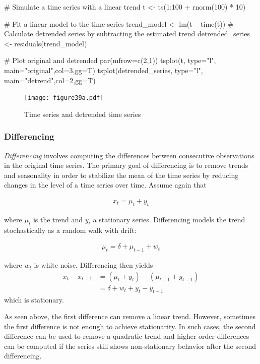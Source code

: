 \begin{samepage}
\begin{Rcode}
# Simulate a time series with a linear trend
t <- ts(1:100 + rnorm(100) * 10)

# Fit a linear model to the time series
trend_model <- lm(t ~ time(t))
# Calculate detrended series by subtracting the estimated trend
detrended_series <- residuals(trend_model)

# Plot original and detrended
par(mfrow=c(2,1))
tsplot(t, type="l", main="original",col=3,gg=T)
tsplot(detrended_series, type="l", main="detrend",col=2,gg=T)
\end{Rcode}
\end{samepage}

\begin{figure}
\centering
\texttt{[image: figure39a.pdf]}
\caption{Time series and detrended time series}
\label{fig:figure39a}
\end{figure}

\subsubsection*{Differencing}

\emph{Differencing} involves computing the differences between consecutive observations in the original time series. The primary goal of differencing is to remove trends and seasonality in order to stabilize the mean of the time series by reducing changes in the level of a time series over time. Assume again that 

\begin{align*}x_t = \mu_t + y_t\end{align*}

\noindent where $\mu_t$ is the trend and $y_t$ a stationary series. Differencing models the trend stochastically as a random walk with drift: 

\begin{align*}\mu_t = \delta + \mu_{t-1} + w_t\end{align*}

\noindent where $w_t$ is white noise. Differencing then yields 
\begin{align*}
x_t - x_{t-1} &= (\mu_t + y_t) - (\mu_{t-1} + y_{t-1}) \\
 &= \delta + w_t + y_t - y_{t-1}
 \end{align*}
\noindent which is stationary.

As seen above, the first difference can remove a linear trend. However, sometimes the first difference is not enough to achieve stationarity. In such cases, the second difference can be used to remove a quadratic trend and higher-order differences can be computed if the series still shows non-stationary behavior after the second differencing.


